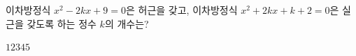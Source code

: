 \hspace*{2mm}\begin{minipage}[t]{\dimexpr\linewidth-2mm\relax}\vspace{0pt}
이차방정식 $x^2-2kx+9=0$은 허근을 갖고, 이차방정식 $x^2+2kx+k+2=0$은 실근을 갖도록 하는 정수 $k$의 개수는?
\begin{choices32}{$1$}{$2$}{$3$}{$4$}{$5$}\end{choices32}\end{minipage}
